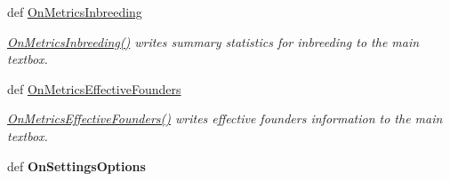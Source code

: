 \begin{DoxyCompactItemize}
def \hyperlink{classPyPedal_1_1pyp__gui_1_1MainWindow_a4990fc004a6796183a52be9ce34a1d6b}{OnMetricsInbreeding}
\begin{DoxyCompactList}\small\item\em \hyperlink{classPyPedal_1_1pyp__gui_1_1MainWindow_a4990fc004a6796183a52be9ce34a1d6b}{OnMetricsInbreeding()} writes summary statistics for inbreeding to the main textbox. \item\end{DoxyCompactList}\item 
def \hyperlink{classPyPedal_1_1pyp__gui_1_1MainWindow_a5fcaaf8521d0df2a691c85569cd667b4}{OnMetricsEffectiveFounders}
\begin{DoxyCompactList}\small\item\em \hyperlink{classPyPedal_1_1pyp__gui_1_1MainWindow_a5fcaaf8521d0df2a691c85569cd667b4}{OnMetricsEffectiveFounders()} writes effective founders information to the main textbox. \item\end{DoxyCompactList}\item 
\hypertarget{classPyPedal_1_1pyp__gui_1_1MainWindow_ac18c336fed82db611adf8aad2346c7d2}{
def {\bfseries OnSettingsOptions}}
\label{classPyPedal_1_1pyp__gui_1_1MainWindow_ac18c336fed82db611adf8aad2346c7d2}

\end{DoxyCompactItemize}
